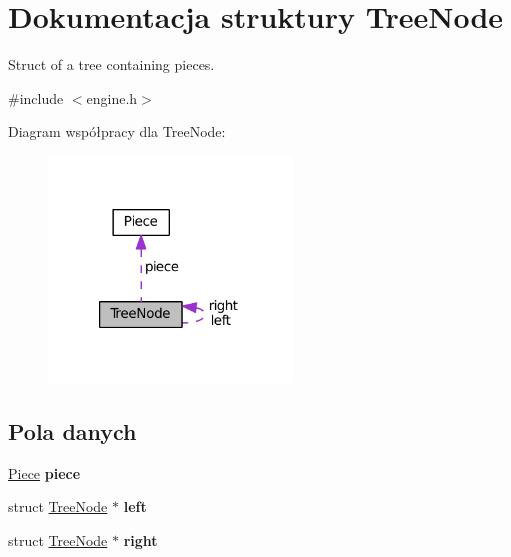 \hypertarget{structTreeNode}{\section{Dokumentacja struktury Tree\-Node}
\label{structTreeNode}
}


Struct of a tree containing pieces.  




{\ttfamily \#include $<$engine.\-h$>$}



Diagram współpracy dla Tree\-Node\-:
\nopagebreak
\begin{figure}[H]
\begin{center}
\leavevmode
\includegraphics[width=184pt]{structTreeNode__coll__graph}
\end{center}
\end{figure}
\subsection*{Pola danych}
\begin{DoxyCompactItemize}
\item 
\hypertarget{structTreeNode_a3f2ec1b7aceb98384fe5a2096b63617f}{\hyperlink{structPiece}{Piece} {\bfseries piece}}\label{structTreeNode_a3f2ec1b7aceb98384fe5a2096b63617f}

\item 
\hypertarget{structTreeNode_af4ab5453a9305f5620c0eb9ac360fb90}{struct \hyperlink{structTreeNode}{Tree\-Node} $\ast$ {\bfseries left}}\label{structTreeNode_af4ab5453a9305f5620c0eb9ac360fb90}

\item 
\hypertarget{structTreeNode_ab36f951b4d3d53dfc2d345978900c6e2}{struct \hyperlink{structTreeNode}{Tree\-Node} $\ast$ {\bfseries right}}\label{structTreeNode_ab36f951b4d3d53dfc2d345978900c6e2}

\end{DoxyCompactItemize}


